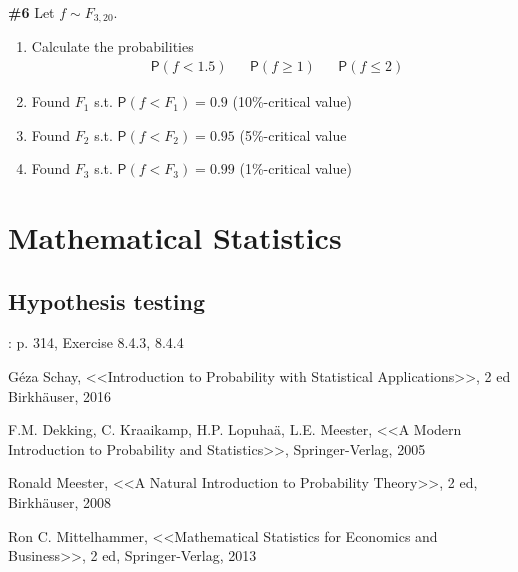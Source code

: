 \documentclass[12pt]{article}
\begin{document}
\noindent\textbf{\#6} Let \(f\sim F_{3,20}\). 
\begin{enumerate}
	\item Calculate the probabilities
	\begin{align*}
	&\mathsf{P}(f<1.5) & &\mathsf{P}(f\geq 1) & &\mathsf{P}( f\leq 2)
	\end{align*}
	\item Found $F_1$ s.t. \(\mathsf{P}(f<F_1)=0.9\) (10\%-critical value)
	\item Found $F_2$ s.t. \(\mathsf{P}(f<F_2)=0.95\) (5\%-critical value
	\item Found $F_3$ s.t. \(\mathsf{P}(f<F_3)=0.99\) (1\%-critical value)
\end{enumerate}


\section{Mathematical Statistics}

\subsection{Hypothesis testing}

\cite{Schay}: p. 314, Exercise 8.4.3, 8.4.4


\begin{thebibliography}{99}

 Géza Schay, <<Introduction to Probability with Statistical Applications>>, 2 ed
Birkhäuser, 2016

 F.M. Dekking, C. Kraaikamp, H.P. Lopuhaä, L.E. Meester, 
<<A Modern Introduction to Probability and Statistics>>, 
Springer-Verlag, 2005

 Ronald Meester, <<A Natural Introduction to Probability Theory>>, 2 ed,
Birkhäuser, 2008

 Ron C. Mittelhammer, <<Mathematical Statistics for Economics and 
Business>>, 2 ed, Springer-Verlag, 2013

%
%

\end{thebibliography}
\end{document}

